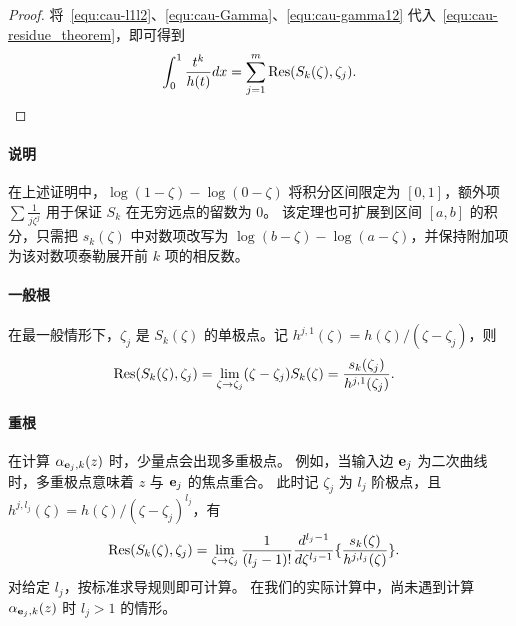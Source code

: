 \begin{proof}
    将~\eqref{equ:cau-l1l2}、\eqref{equ:cau-Gamma}、\eqref{equ:cau-gamma12} 代入~\eqref{equ:cau-residue_theorem}，即可得到
    \begin{equation}
        \int_0^1 \frac{t^k}{ h(t)}dx=\sum_{j=1}^{m}\mathop{\mathrm{Res}}(S_k(\zeta),\zeta_j).
    \end{equation}
\end{proof}

\paragraph{说明}
在上述证明中，$\log(1-\zeta) - \log(0-\zeta)$ 将积分区间限定为 \([0,1]\)，额外项 $\sum \frac{1}{j \zeta^j}$ 用于保证 \(S_k\) 在无穷远点的留数为 0。
该定理也可扩展到区间 \([a,b]\) 的积分，只需把 $s_k(\zeta)$ 中对数项改写为 \(\log(b-\zeta)-\log(a-\zeta)\)，并保持附加项为该对数项泰勒展开前 $k$ 项的相反数。

\paragraph{一般根}
在最一般情形下，\( \zeta_j \) 是 \( S_k(\zeta) \) 的单极点。记 $h^{j,1}(\zeta)=h(\zeta)/(\zeta-\zeta_j)$，则
\begin{equation}\label{equ:cau-gene_expression}
\begin{aligned}
    &\mathop{\mathrm{Res}}(S_k(\zeta),\zeta_j)=\lim_{\zeta\to \zeta_j}(\zeta-\zeta_j)S_k(\zeta)=\frac{s_k(\zeta_j)}{h^{j,1}(\zeta_j)}.
    \end{aligned}
\end{equation}

\paragraph{重根}
在计算 \(\alpha_{\mathbf{e}_j,k}(z)\) 时，少量点会出现多重极点。
例如，当输入边 $\mathbf{e}_j$ 为二次曲线时，多重极点意味着 \(z\) 与 $\mathbf{e}_j$ 的焦点重合。
此时记 \( \zeta_j \) 为 $l_j$ 阶极点，且 $h^{j,l_j}(\zeta)=h(\zeta)/(\zeta-\zeta_j)^{l_j}$，有
\begin{equation}\label{equ:cau-repeated_expression}
\begin{aligned}
&\mathop{\mathrm{Res}}(S_k(\zeta),\zeta_j)
    =\lim_{\zeta\to \zeta_j}\frac{1}{(l_j-1)!}\frac{d^{l_j-1}}{d\zeta^{l_j-1}}\{\frac{s_k(\zeta)}{h^{j,l_j}(\zeta)}\}.
    \end{aligned}
\end{equation}
对给定 $l_j$，按标准求导规则即可计算。
在我们的实际计算中，尚未遇到计算 \(\alpha_{\mathbf{e}_j,k}(z)\) 时 $l_j>1$ 的情形。

